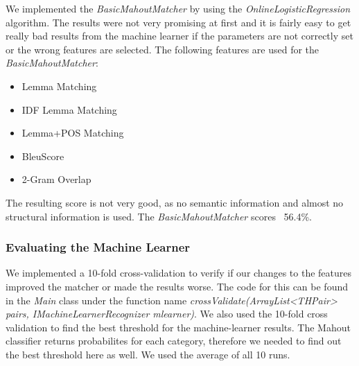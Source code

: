 We implemented the \textit{BasicMahoutMatcher} by using
the \textit{OnlineLogisticRegression} algorithm. The results were not very promising at first and it is fairly easy to
get really bad results from the machine learner if the parameters are not correctly set or the wrong features are
selected. The following features are used for the \textit{BasicMahoutMatcher}:

\begin{itemize}
    \item Lemma Matching
    \item IDF Lemma Matching
    \item Lemma+POS Matching
    \item BleuScore
    \item 2-Gram Overlap
\end{itemize}

The resulting score is not very good, as no semantic information and almost no structural information is used. The
\textit{BasicMahoutMatcher} scores ~56.4\%.

\subsubsection{Evaluating the Machine Learner}
We implemented a 10-fold cross-validation to verify if our changes to the features improved the matcher or made the
results worse. The code for this can be found in the \textit{Main} class under the function name
\textit{crossValidate(ArrayList<THPair> pairs, IMachineLearnerRecognizer mlearner)}. We also used the 10-fold cross
validation to find the best threshold for the machine-learner results. The Mahout classifier returns probabilites for
each category, therefore we needed to find out the best threshold here as well. We used the average of all 10 runs.


